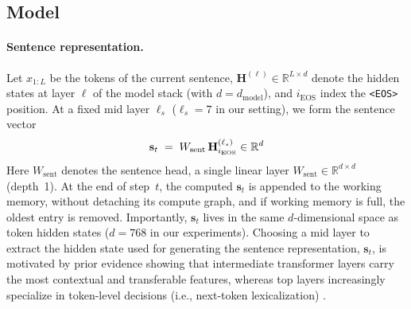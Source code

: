 \documentclass{article}
\begin{document}
\subsection{Model}\label{sec:model}


\paragraph{Sentence representation.}
Let $x_{1:L}$ be the tokens of the current sentence, $\mathbf{H}^{(\ell)} \in \mathbb{R}^{L\times d}$ denote the hidden states at layer $\ell$ of the model stack
(with $d=d_{\text{model}}$), and  $i_{\text{EOS}}$ index the \texttt{<EOS>} position.
At a fixed mid layer $\ell_s$ ($\ell_s=7$ in our setting), we form the sentence vector
\vspace{0.2cm}
\[
\mathbf{s}_t \;=\; W_{\text{sent}}\, \mathbf{H}^{(\ell_s)}_{i_{\text{EOS}}} \in \mathbb{R}^{d}
\vspace{0.2cm}
\]
Here $W_{\text{sent}}$ denotes the sentence head, a single linear layer
$W_{\text{sent}}\!\in\!\mathbb{R}^{d\times d}$ (depth~1). At the end of step~$t$, the computed $\mathbf{s}_t$ is appended to the working memory, without detaching its compute graph, and if working memory is full, the oldest entry is removed.
Importantly, $\mathbf{s}_t$ lives in the same $d$-dimensional space as token hidden states
($d=768$ in our experiments).
Choosing a mid layer to extract the hidden state used for generating the sentence representation, $\mathbf{s}_{t}$, is motivated by prior evidence showing that intermediate transformer layers carry the most contextual and transferable features, whereas top layers increasingly specialize in token-level decisions (i.e., next-token lexicalization) \citep{geva2021ffnkv, Liu2023LostInTheMiddle, rogers2020primer}.
\end{document}
